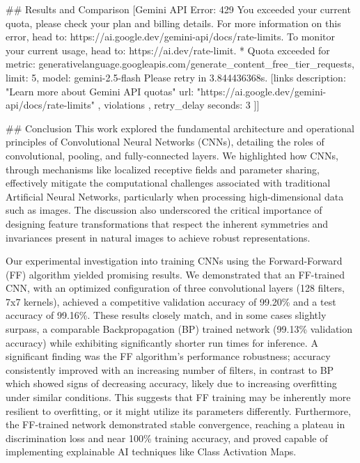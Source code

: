 \documentclass{article}
\begin{document}
\#\# Results and Comparison
[Gemini API Error: 429 You exceeded your current quota, please check your plan and billing details. For more information on this error, head to: https://ai.google.dev/gemini-api/docs/rate-limits. To monitor your current usage, head to: https://ai.dev/rate-limit.
* Quota exceeded for metric: generativelanguage.googleapis.com/generate_content_free_tier_requests, limit: 5, model: gemini-2.5-flash
Please retry in 3.844436368s. [links {
description: "Learn more about Gemini API quotas"
url: "https://ai.google.dev/gemini-api/docs/rate-limits"
}
, violations {
}
, retry_delay {
seconds: 3
}
]]

\#\# Conclusion
This work explored the fundamental architecture and operational principles of Convolutional Neural Networks (CNNs), detailing the roles of convolutional, pooling, and fully-connected layers. We highlighted how CNNs, through mechanisms like localized receptive fields and parameter sharing, effectively mitigate the computational challenges associated with traditional Artificial Neural Networks, particularly when processing high-dimensional data such as images. The discussion also underscored the critical importance of designing feature transformations that respect the inherent symmetries and invariances present in natural images to achieve robust representations.

Our experimental investigation into training CNNs using the Forward-Forward (FF) algorithm yielded promising results. We demonstrated that an FF-trained CNN, with an optimized configuration of three convolutional layers (128 filters, 7x7 kernels), achieved a competitive validation accuracy of 99.20\% and a test accuracy of 99.16\%. These results closely match, and in some cases slightly surpass, a comparable Backpropagation (BP) trained network (99.13\% validation accuracy) while exhibiting significantly shorter run times for inference. A significant finding was the FF algorithm's performance robustness; accuracy consistently improved with an increasing number of filters, in contrast to BP which showed signs of decreasing accuracy, likely due to increasing overfitting under similar conditions. This suggests that FF training may be inherently more resilient to overfitting, or it might utilize its parameters differently. Furthermore, the FF-trained network demonstrated stable convergence, reaching a plateau in discrimination loss and near 100\% training accuracy, and proved capable of implementing explainable AI techniques like Class Activation Maps.
\end{document}
